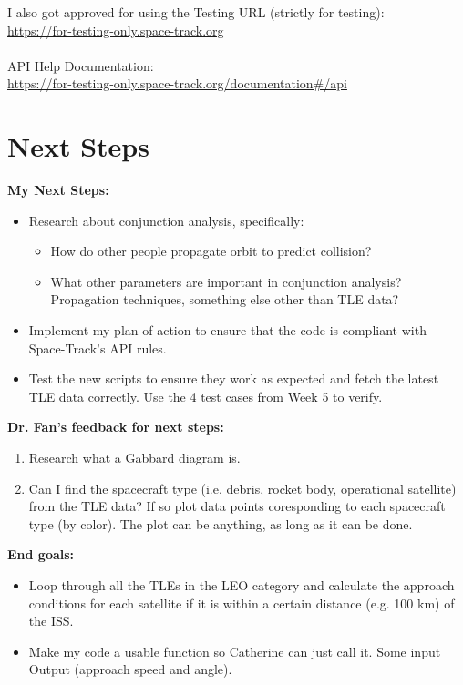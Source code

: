 \documentclass[12pt]{report}
\begin{document}
\begin{enumerate}
  I also got approved for using the Testing URL (strictly for testing):
  \\ \url{https://for-testing-only.space-track.org}
  \\ \\
  API Help Documentation:
  \\ \url{https://for-testing-only.space-track.org/documentation#/api}
  
\end{enumerate}

\chapter*{Next Steps}

\textbf{My Next Steps:}
\begin{itemize}
  \item Research about conjunction analysis, specifically: 
  \begin{itemize}
    \item How do other people propagate orbit to predict collision?
    \item What other parameters are important in conjunction analysis? Propagation techniques, something else other than TLE data?
  \end{itemize}
  \item Implement my plan of action to ensure that the code is compliant with Space-Track's API rules.
  \item Test the new scripts to ensure they work as expected and fetch the latest TLE data correctly. Use the 4 test cases from Week 5 to verify.
\end{itemize}

\noindent \textbf{Dr. Fan's feedback for next steps:}
  \begin{enumerate}
    \item Research what a Gabbard diagram is.
    \item Can I find the spacecraft type (i.e. debris, rocket body, operational satellite) from the TLE data? If so plot data points coresponding to each spacecraft type (by color). The plot can be anything, as long as it can be done.
  \end{enumerate}

\noindent \textbf{End goals:}
\begin{itemize}
  \item Loop through all the TLEs in the LEO category and calculate the approach conditions for each satellite if it is within a certain distance (e.g. 100 km) of the ISS.
  \item Make my code a usable function so Catherine can just call it. Some input \textrightarrow{} Output (approach speed and angle).
\end{itemize}
\end{document}
